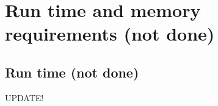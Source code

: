 \documentclass[11pt]{report}
\begin{document}
\chapter{Run time and memory requirements (not done)}\label{sec:performance}

\section{Run time (not done)}
UPDATE!

\end{document}

